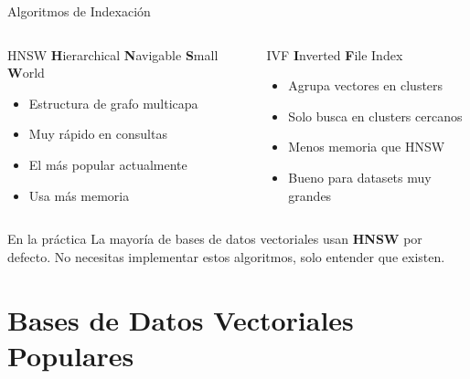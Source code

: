 \documentclass[aspectratio=169]{beamer}
\begin{document}
\begin{frame}{Algoritmos de Indexación}
    \begin{columns}[t]
        \begin{block}{HNSW}
            \textbf{H}ierarchical \textbf{N}avigable \textbf{S}mall \textbf{W}orld
            \begin{itemize}
                \item Estructura de grafo multicapa
                \item Muy rápido en consultas
                \item El más popular actualmente
                \item Usa más memoria
            \end{itemize}
        \end{block}
        
        \begin{block}{IVF}
            \textbf{I}nverted \textbf{F}ile Index
            \begin{itemize}
                \item Agrupa vectores en clusters
                \item Solo busca en clusters cercanos
                \item Menos memoria que HNSW
                \item Bueno para datasets muy grandes
            \end{itemize}
        \end{block}
    \end{columns}
    
    \vspace{0.4cm}
    \begin{exampleblock}{En la práctica}
        La mayoría de bases de datos vectoriales usan \textbf{HNSW} por defecto. No necesitas implementar estos algoritmos, solo entender que existen.
    \end{exampleblock}
\end{frame}

\section{Bases de Datos Vectoriales Populares}
\end{document}

